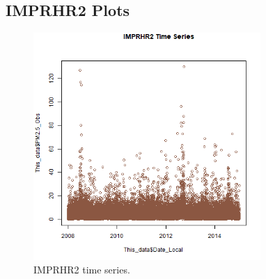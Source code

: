 
\subsection*{IMPRHR2 Plots}
\begin{figure} 
\centering 
\includegraphics[width=0.77\textwidth]{Code_Outputs/IMPRHR2_time_series.png} 
\caption{\label{fig:IMPRHR2TS}IMPRHR2 time series.} 
\end{figure} 
 

